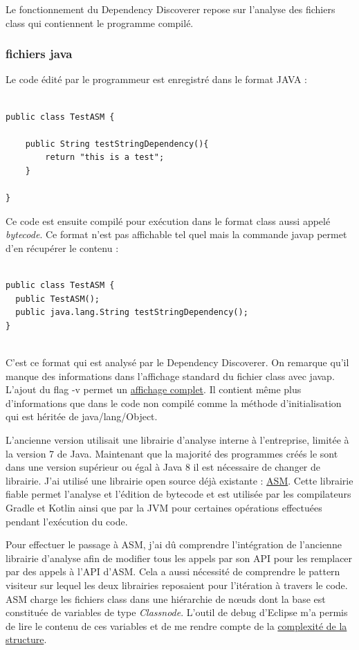 \documentclass[french,a4paper,12pt]{report}
\begin{document}
Le fonctionnement du Dependency Discoverer repose sur l'analyse des fichiers class qui contiennent le programme compilé. 

\bigskip

\subsubsection{fichiers java}

Le code édité par le programmeur est enregistré dans le format JAVA :

\begin{lstlisting}

public class TestASM {
	
	public String testStringDependency(){
		return "this is a test";
	}
	
}

\end{lstlisting}

Ce code est ensuite compilé pour exécution dans le format class aussi appelé \textit{bytecode}. Ce format n'est pas affichable tel quel mais la commande javap permet d'en récupérer le contenu :

\begin{lstlisting}

public class TestASM {
  public TestASM();
  public java.lang.String testStringDependency();
}


\end{lstlisting}

C'est ce format qui est analysé par le Dependency Discoverer. On remarque qu'il manque des informations dans l'affichage standard du fichier class avec javap. L'ajout du flag -v permet un \hyperref[javapVtestASM]{affichage complet}. Il contient même plus d'informations que dans le code non compilé comme la méthode d'initialisation qui est héritée de java/lang/Object.

\bigskip

L'ancienne version utilisait une librairie d'analyse interne à l'entreprise, limitée à la version 7 de Java. Maintenant que la majorité des programmes créés le sont dans une version supérieur ou égal à Java 8 il est nécessaire de changer de librairie. J'ai utilisé une librairie open source déjà existante : \href{https://asm.ow2.io/}{ASM}. Cette librairie fiable permet l'analyse et l'édition de bytecode et est utilisée par les compilateurs Gradle et Kotlin ainsi que par la JVM pour certaines opérations effectuées pendant l’exécution du code.

Pour effectuer le passage à ASM, j'ai dû comprendre l'intégration de l'ancienne librairie d'analyse afin de modifier tous les appels par son API pour les remplacer par des appels à l'API d'ASM. Cela a aussi nécessité de comprendre le pattern visiteur sur lequel les deux librairies reposaient pour l'itération à travers le code. ASM charge les fichiers class dans une hiérarchie de nœuds dont la base est constituée de variables de type \textit{Classnode}. L'outil de debug d'Eclipse m'a permis de lire le contenu de ces variables et de me rendre compte de la \hyperref[ClassNode]{complexité de la structure}.
\end{document}
